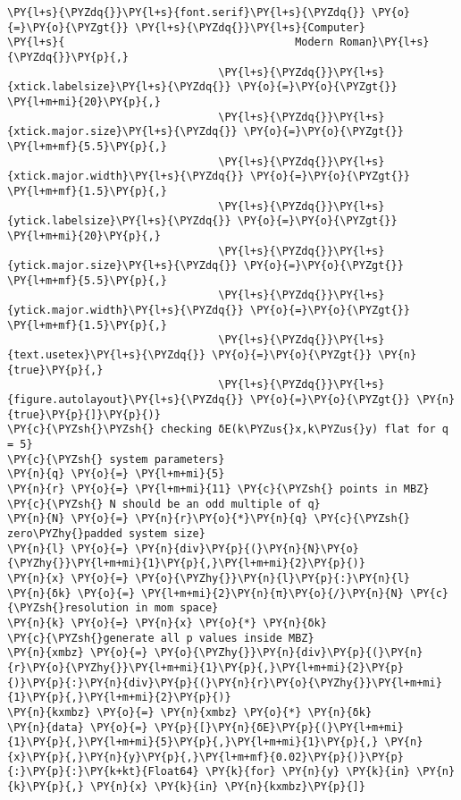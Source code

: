 \begin{Verbatim}[commandchars=\\\{\}]
                                 \PY{l+s}{\PYZdq{}}\PY{l+s}{font.serif}\PY{l+s}{\PYZdq{}} \PY{o}{=}\PY{o}{\PYZgt{}} \PY{l+s}{\PYZdq{}}\PY{l+s}{Computer}
\PY{l+s}{                                    Modern Roman}\PY{l+s}{\PYZdq{}}\PY{p}{,}
                                 \PY{l+s}{\PYZdq{}}\PY{l+s}{xtick.labelsize}\PY{l+s}{\PYZdq{}} \PY{o}{=}\PY{o}{\PYZgt{}} \PY{l+m+mi}{20}\PY{p}{,}
                                 \PY{l+s}{\PYZdq{}}\PY{l+s}{xtick.major.size}\PY{l+s}{\PYZdq{}} \PY{o}{=}\PY{o}{\PYZgt{}} \PY{l+m+mf}{5.5}\PY{p}{,}
                                 \PY{l+s}{\PYZdq{}}\PY{l+s}{xtick.major.width}\PY{l+s}{\PYZdq{}} \PY{o}{=}\PY{o}{\PYZgt{}} \PY{l+m+mf}{1.5}\PY{p}{,}
                                 \PY{l+s}{\PYZdq{}}\PY{l+s}{ytick.labelsize}\PY{l+s}{\PYZdq{}} \PY{o}{=}\PY{o}{\PYZgt{}} \PY{l+m+mi}{20}\PY{p}{,}
                                 \PY{l+s}{\PYZdq{}}\PY{l+s}{ytick.major.size}\PY{l+s}{\PYZdq{}} \PY{o}{=}\PY{o}{\PYZgt{}} \PY{l+m+mf}{5.5}\PY{p}{,}
                                 \PY{l+s}{\PYZdq{}}\PY{l+s}{ytick.major.width}\PY{l+s}{\PYZdq{}} \PY{o}{=}\PY{o}{\PYZgt{}} \PY{l+m+mf}{1.5}\PY{p}{,}
                                 \PY{l+s}{\PYZdq{}}\PY{l+s}{text.usetex}\PY{l+s}{\PYZdq{}} \PY{o}{=}\PY{o}{\PYZgt{}} \PY{n}{true}\PY{p}{,}
                                 \PY{l+s}{\PYZdq{}}\PY{l+s}{figure.autolayout}\PY{l+s}{\PYZdq{}} \PY{o}{=}\PY{o}{\PYZgt{}} \PY{n}{true}\PY{p}{]}\PY{p}{)}
\PY{c}{\PYZsh{}\PYZsh{} checking δE(k\PYZus{}x,k\PYZus{}y) flat for q = 5}
\PY{c}{\PYZsh{} system parameters}
\PY{n}{q} \PY{o}{=} \PY{l+m+mi}{5}
\PY{n}{r} \PY{o}{=} \PY{l+m+mi}{11} \PY{c}{\PYZsh{} points in MBZ}
\PY{c}{\PYZsh{} N should be an odd multiple of q}
\PY{n}{N} \PY{o}{=} \PY{n}{r}\PY{o}{*}\PY{n}{q} \PY{c}{\PYZsh{} zero\PYZhy{}padded system size}
\PY{n}{l} \PY{o}{=} \PY{n}{div}\PY{p}{(}\PY{n}{N}\PY{o}{\PYZhy{}}\PY{l+m+mi}{1}\PY{p}{,}\PY{l+m+mi}{2}\PY{p}{)}
\PY{n}{x} \PY{o}{=} \PY{o}{\PYZhy{}}\PY{n}{l}\PY{p}{:}\PY{n}{l}
\PY{n}{δk} \PY{o}{=} \PY{l+m+mi}{2}\PY{n}{π}\PY{o}{/}\PY{n}{N} \PY{c}{\PYZsh{}resolution in mom space}
\PY{n}{k} \PY{o}{=} \PY{n}{x} \PY{o}{*} \PY{n}{δk}
\PY{c}{\PYZsh{}generate all p values inside MBZ}
\PY{n}{xmbz} \PY{o}{=} \PY{o}{\PYZhy{}}\PY{n}{div}\PY{p}{(}\PY{n}{r}\PY{o}{\PYZhy{}}\PY{l+m+mi}{1}\PY{p}{,}\PY{l+m+mi}{2}\PY{p}{)}\PY{p}{:}\PY{n}{div}\PY{p}{(}\PY{n}{r}\PY{o}{\PYZhy{}}\PY{l+m+mi}{1}\PY{p}{,}\PY{l+m+mi}{2}\PY{p}{)}
\PY{n}{kxmbz} \PY{o}{=} \PY{n}{xmbz} \PY{o}{*} \PY{n}{δk}
\PY{n}{data} \PY{o}{=} \PY{p}{[}\PY{n}{δE}\PY{p}{(}\PY{l+m+mi}{1}\PY{p}{,}\PY{l+m+mi}{5}\PY{p}{,}\PY{l+m+mi}{1}\PY{p}{,} \PY{n}{x}\PY{p}{,}\PY{n}{y}\PY{p}{,}\PY{l+m+mf}{0.02}\PY{p}{)}\PY{p}{:}\PY{p}{:}\PY{k+kt}{Float64} \PY{k}{for} \PY{n}{y} \PY{k}{in} \PY{n}{k}\PY{p}{,} \PY{n}{x} \PY{k}{in} \PY{n}{kxmbz}\PY{p}{]}

\end{Verbatim}

